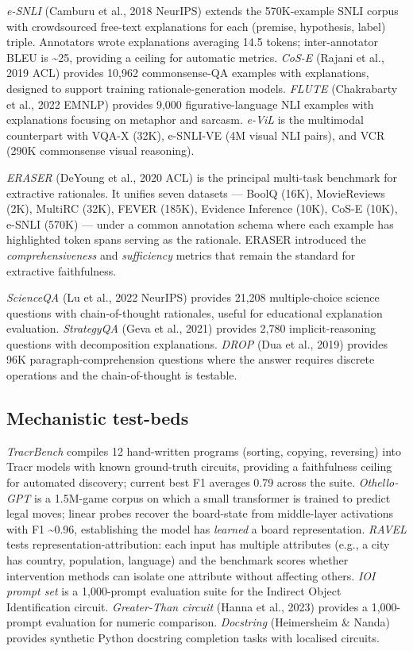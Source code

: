 \documentclass{article}
\begin{document}
\emph{e-SNLI} (Camburu et al., 2018 NeurIPS) extends the 570K-example SNLI corpus with crowdsourced free-text explanations for each (premise, hypothesis, label) triple. Annotators wrote explanations averaging 14.5 tokens; inter-annotator BLEU is \textasciitilde25, providing a ceiling for automatic metrics. \emph{CoS-E} (Rajani et al., 2019 ACL) provides 10,962 commonsense-QA examples with explanations, designed to support training rationale-generation models. \emph{FLUTE} (Chakrabarty et al., 2022 EMNLP) provides 9,000 figurative-language NLI examples with explanations focusing on metaphor and sarcasm. \emph{e-ViL} \citep{kayser2021eviladatasetandben} is the multimodal counterpart with VQA-X (32K), e-SNLI-VE (4M visual NLI pairs), and VCR (290K commonsense visual reasoning).

\emph{ERASER} (DeYoung et al., 2020 ACL) is the principal multi-task benchmark for extractive rationales. It unifies seven datasets --- BoolQ (16K), MovieReviews (2K), MultiRC (32K), FEVER (185K), Evidence Inference (10K), CoS-E (10K), e-SNLI (570K) --- under a common annotation schema where each example has highlighted token spans serving as the rationale. ERASER introduced the \emph{comprehensiveness} and \emph{sufficiency} metrics that remain the standard for extractive faithfulness.

\emph{ScienceQA} (Lu et al., 2022 NeurIPS) provides 21,208 multiple-choice science questions with chain-of-thought rationales, useful for educational explanation evaluation. \emph{StrategyQA} (Geva et al., 2021) provides 2,780 implicit-reasoning questions with decomposition explanations. \emph{DROP} (Dua et al., 2019) provides 96K paragraph-comprehension questions where the answer requires discrete operations and the chain-of-thought is testable.

\subsection{Mechanistic test-beds}\label{mechanistic-test-beds}

\emph{TracrBench} \citep{thurnherr2024tracrbenchgenerati} compiles 12 hand-written programs (sorting, copying, reversing) into Tracr models with known ground-truth circuits, providing a faithfulness ceiling for automated discovery; current best F1 averages 0.79 across the suite. \emph{Othello-GPT} \citep{li2024pmetprecisemodeled} is a 1.5M-game corpus on which a small transformer is trained to predict legal moves; linear probes recover the board-state from middle-layer activations with F1 \textasciitilde0.96, establishing the model has \emph{learned} a board representation. \emph{RAVEL} \citep{huang2023asurveyonhallucina} tests representation-attribution: each input has multiple attributes (e.g., a city has country, population, language) and the benchmark scores whether intervention methods can isolate one attribute without affecting others. \emph{IOI prompt set} \citep{wang2022interpretabilityin} is a 1,000-prompt evaluation suite for the Indirect Object Identification circuit. \emph{Greater-Than circuit} (Hanna et al., 2023) provides a 1,000-prompt evaluation for numeric comparison. \emph{Docstring} (Heimersheim \& Nanda) provides synthetic Python docstring completion tasks with localised circuits.
\end{document}
